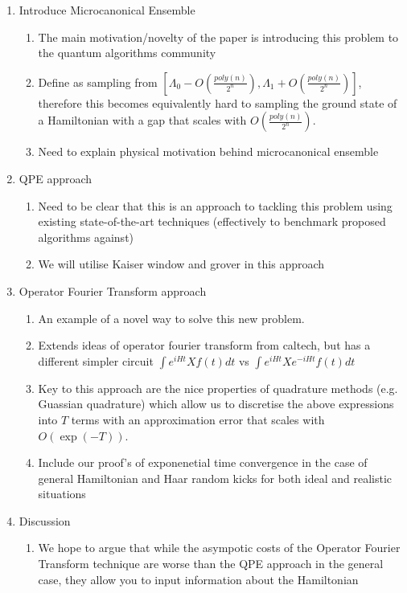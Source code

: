 \documentclass[10pt]{amsart}
\begin{document}
\begin{enumerate}
    \item Introduce Microcanonical Ensemble
        \begin{enumerate}
            \item The main motivation/novelty of the paper is introducing this problem to the quantum algorithms community
            \item Define as sampling from $[\Lambda_0 - O(\frac{poly(n)}{2^n}), \Lambda_1+ O(\frac{poly(n)}{2^n})]$, therefore this becomes equivalently hard to sampling the ground state of a Hamiltonian with a gap that scales with $O(\frac{poly(n)}{2^n})$.
            \item Need to explain physical motivation behind microcanonical ensemble
        \end{enumerate}
    \item QPE approach
        \begin{enumerate}
            \item Need to be clear that this is an approach to tackling this problem using existing state-of-the-art techniques (effectively to benchmark proposed algorithms against)
            \item We will utilise Kaiser window and grover in this approach
        \end{enumerate}
    \item Operator Fourier Transform approach
        \begin{enumerate}
            \item An example of a novel way to solve this new problem.
            \item Extends ideas of operator fourier transform from caltech, but has a different simpler circuit $\int e^{iHt}X f(t)dt$ vs $\int e^{iHt}Xe^{-iHt} f(t)dt$
            \item Key to this approach are the nice properties of quadrature methods (e.g. Guassian quadrature) which allow us to discretise the above expressions into $T$ terms with an approximation error that scales with $O(\exp(-T))$.
            \item Include our proof's of exponenetial time convergence in the case of general Hamiltonian and Haar random kicks for both ideal and realistic situations
        \end{enumerate}
    \item Discussion
    \begin{enumerate}
        \item We hope to argue that while the asympotic costs of the Operator Fourier Transform technique are worse than the QPE approach in the general case, they allow you to input information about the Hamiltonian

\end{enumerate}
\end{enumerate}
\end{document}
